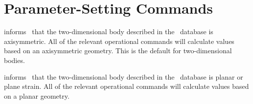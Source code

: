 \section{Parameter-Setting Commands}\label{sec:param}

 {
 informs \numbers\ that the two-dimensional body
described in the \EXO\ database is axisymmetric.  All of the relevant
operational commands will calculate values based on an axisymmetric
geometry.  This is the default for two-dimensional bodies.
}

 {
 informs \numbers\ that the two-dimensional body described
in the \EXO\ database is planar or plane strain. All of the relevant
operational commands will calculate values based on a planar geometry. 
}

